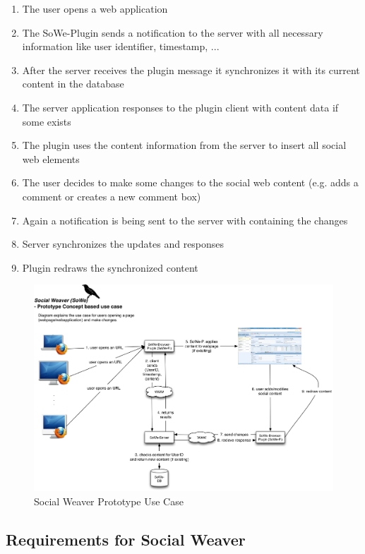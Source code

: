 \begin{enumerate}
\item The user opens a web application
\item The SoWe-Plugin sends a notification to the server with all necessary information like user identifier, timestamp, ...
\item After the server receives the plugin message it synchronizes it with its current content in the database
\item The server application responses to the plugin client with content data if some exists
\item The plugin uses the content information from the server to insert all social web elements
\item The user decides to make some changes to the social web content (e.g. adds a comment or creates a new comment box)
\item Again a notification is being sent to the server with containing the changes
\item Server synchronizes the updates and responses
\item Plugin redraws the synchronized content
\end{enumerate}

\begin{figure}[h!] \centering
		\includegraphics[width=13cm]{images/sowe-prototype-use-case.png}
		\caption{Social Weaver Prototype Use Case}
		\label{sowe-prototype-use-case}
\end{figure} 

\subsection{Requirements for Social Weaver}\label{sowe-reqs}

